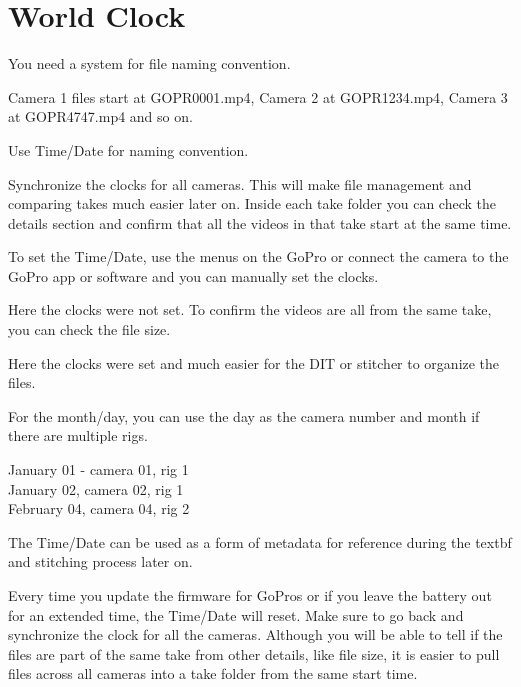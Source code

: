 \section{World Clock}
\pagecolor{white}
\label{chap:5}
\begin{fullwidth}

\problem

{\large You need a system for file naming convention. \par}

Camera 1 files start at GOPR0001.mp4, Camera 2 at GOPR1234.mp4, Camera 3 at GOPR4747.mp4 and so on. 


\solution

{\large Use Time/Date for naming convention. \par}

Synchronize the clocks for all cameras. This will make file management and comparing takes much easier later on. Inside each take folder you can check the details section and confirm that all the videos in that take start at the same time. 

To set the Time/Date, use the menus on the GoPro or connect the camera to the GoPro app or software and you can manually set the clocks.


Here the clocks were not set. To confirm the videos are all from the same take, you can check the file size. 


Here the clocks were set and much easier for the DIT or stitcher to organize the files.


For the month/day, you can use the day as the camera number and month if there are multiple rigs. 

January 01 - camera 01, rig 1
\\
January 02, camera 02, rig 1
\\
February 04, camera 04, rig 2


The Time/Date can be used as a form of metadata for reference during the textbf{} and stitching process later on. 

\tip Every time you update the firmware for GoPros or if you leave the battery out for an extended time, the Time/Date will reset. Make sure to go back and synchronize the clock for all the cameras. Although you will be able to tell if the files are part of the same take from other details, like file size, it is easier to pull files across all cameras into a take folder from the same start time. 




\clearpage
\end{fullwidth}
